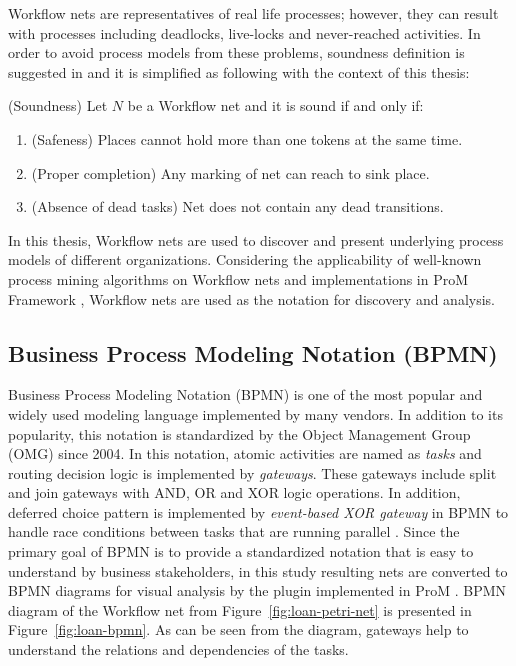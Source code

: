 Workflow nets are representatives of real life processes; however, they can result with processes including deadlocks, live-locks and never-reached activities. In order to avoid process models from these problems, soundness definition is suggested in \cite{van1998application} and it is simplified as following with the context of this thesis:
\theoremstyle{definition}
\begin{definition}{}
(Soundness) Let $N$ be a Workflow net and it is sound if and only if:
\begin{enumerate}
  \item  (Safeness) Places cannot hold more than one tokens at the same time.
  \item  (Proper completion) Any marking of net can reach to sink place.
  \item  (Absence of dead tasks) Net does not contain any dead transitions.  
\end{enumerate}
\end{definition}

In this thesis, Workflow nets are used to discover and present underlying process models of different organizations. Considering the applicability of well-known process mining algorithms on Workflow nets and implementations in ProM Framework \cite{verbeek2010prom}, Workflow nets are used as the notation for discovery and analysis.

\subsection{Business Process Modeling Notation (BPMN)}
\label{sec:bpmn} 
Business Process Modeling Notation (BPMN) is one of the most popular and widely used modeling language implemented by many vendors. In addition to its popularity, this notation is standardized by the Object Management Group (OMG) since 2004. In this notation, atomic activities are named as \textit{tasks} and routing decision logic is implemented by \textit{gateways}. These gateways include split and join gateways with AND, OR and XOR logic operations. In addition, deferred choice pattern is implemented by \textit{event-based XOR gateway} in BPMN to handle race conditions between tasks that are running parallel \cite{van2003workflow}. Since the primary goal of BPMN is to provide a standardized notation that is easy to understand by business stakeholders, in this study resulting nets are converted to BPMN diagrams for visual analysis by the plugin implemented in ProM \cite{kalenkovaprocess}. BPMN diagram of the Workflow net from Figure~\ref{fig:loan-petri-net} is presented in Figure~\ref{fig:loan-bpmn}. As can be seen from the diagram, gateways help to understand the relations and dependencies of the tasks.

